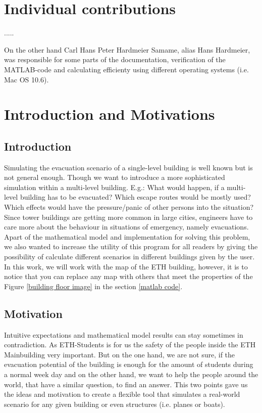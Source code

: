 \documentclass[11pt]{article}
\begin{document}
\section{Individual contributions}


.....

On the other hand Carl Hans Peter Hardmeier Samame, alias Hans Hardmeier, was responsible for some parts of the documentation, verification of the MATLAB-code and calculating efficienty using different operating systems (i.e. Mac OS 10.6).



\section{Introduction and Motivations}

\subsection{Introduction}

Simulating the evacuation scenario of a single-level building is well known but is not general enough. Though we want to introduce a more sophisticated simulation within a multi-level building. E.g.: What would happen, if a multi-level building has to be evacuated? Which escape routes would be mostly used? Which effects would have the pressure/panic of other persons into the situation? Since tower buildings are getting more common in large cities, engineers have to care more about the behaviour in situations of emergency, namely evacuations. Apart of the mathematical model and implementation for solving this problem, we also wanted to increase the utility of this program for all readers by giving the possibility of calculate different scenarios in different buildings given by the user. In this work, we will work with the map of the ETH building, however, it is to notice that you can replace any map with others that meet the properties of the Figure \ref{building floor image} in the section \ref{matlab code}.

\subsection{Motivation}

Intuitive expectations and mathematical model results can stay sometimes in contradiction. As ETH-Students is for us the safety of the people inside the ETH Mainbuilding very important. But on the one hand, we are not sure, if the evacuation potential of the building is enough for the amount of students during a normal week day and on the other hand, we want to help the people around the world, that have a similar question, to find an answer. This two points gave us the ideas and motivation to create a flexible tool that simulates a real-world scenario for any given building or even structures (i.e. planes or boats).
\end{document}
